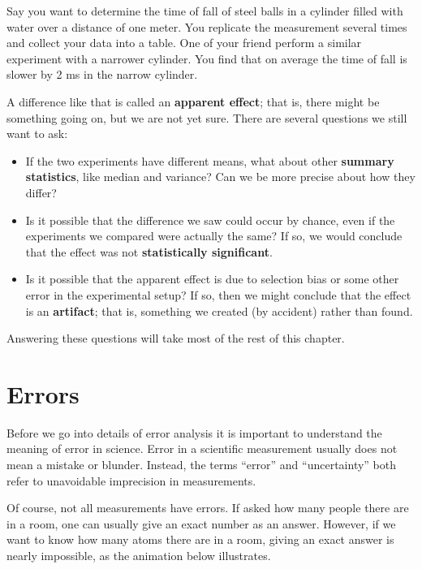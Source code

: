Say you want to determine the time of fall of steel balls in a cylinder filled with water over a distance of one meter.  You replicate the measurement several times  and collect your data into a table. One of your friend perform a similar experiment with a narrower cylinder. You find that on average the time of fall is slower by 2 ms in the narrow cylinder. 


A difference like that is called an {\bf apparent effect}; that is,
there might be something going on, but we are not yet sure.  There are
several questions we still want to ask:

\begin{itemize}

\item If the two experiments have different means, what about other {\bf
  summary statistics}, like median and variance?  Can we be more
  precise about how they differ?

\item Is it possible that the difference we saw could occur by chance,
  even if the experiments we compared were actually the same?  If so,
  we would conclude that the effect was not {\bf statistically
    significant}.


\item Is it possible that the apparent effect is due to selection bias or
  some other error in the experimental setup?  If so, then we might
  conclude that the effect is an {\bf artifact}; that is, something we
  created (by accident) rather than found. 

\end{itemize}

Answering these questions will take most of the rest of this chapter.

\section{Errors}
 Before we go into details of error analysis it is important to understand the meaning of error in science. Error in a scientific measurement usually does not mean a mistake or blunder. Instead, the terms ``error'' and ``uncertainty'' both refer to unavoidable imprecision in measurements.

Of course, not all measurements have errors. If asked how many people there are in a room, one can usually give an exact number as an answer. However, if we want to know how many atoms there are in a room, giving an exact answer is nearly impossible, as the animation below illustrates.


